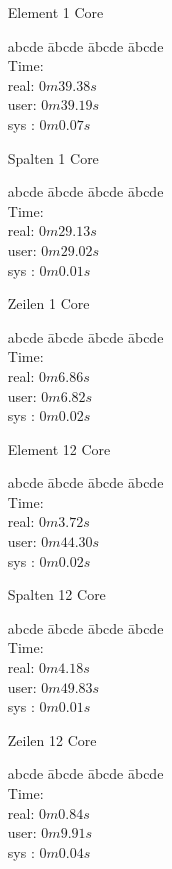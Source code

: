 \documentclass[11pt]{article}
\begin{document}
\scriptsize
{
\begin{enumerate}[leftmargin=4cm]
\item[Element 1 Core]
\begin{tabbing}
abcde \= abcde \= abcde \= abcde \kill
\\Time:\\
\>real: $0m39.38s$ \\
\>user: $0m39.19s$ \\
\>sys : $0m0.07s$ \\
\end{tabbing}
\item[Spalten 1 Core]
\begin{tabbing}
abcde \= abcde \= abcde \= abcde \kill
\\Time:\\
\>real: $0m29.13s$ \\
\>user: $0m29.02s$ \\
\>sys : $0m0.01s$
\end{tabbing}
\item[Zeilen 1 Core]
\begin{tabbing}
abcde \= abcde \= abcde \= abcde \kill
\\Time:\\
\>real: $0m6.86s$ \\
\>user: $0m6.82s$ \\
\>sys : $0m0.02s$
\end{tabbing}
\end{enumerate}
\begin{enumerate}[leftmargin=4cm]
\item[Element 12 Core]
\begin{tabbing}
abcde \= abcde \= abcde \= abcde \kill
\\Time:\\
\>real: $0m3.72s$ \\
\>user: $0m44.30s$ \\
\>sys : $0m0.02s$
\end{tabbing}
\item[Spalten 12 Core]
\begin{tabbing}
abcde \= abcde \= abcde \= abcde \kill
\\Time:\\
\>real: $0m4.18s$ \\
\>user: $0m49.83s$ \\
\>sys : $0m0.01s$
\end{tabbing}
\item[Zeilen 12 Core]
\begin{tabbing}
abcde \= abcde \= abcde \= abcde \kill
\\Time:\\
\>real: $0m0.84s$ \\
\>user: $0m9.91s$ \\
\>sys : $0m0.04s$
\end{tabbing}
\end{enumerate} 
}
\end{document}
